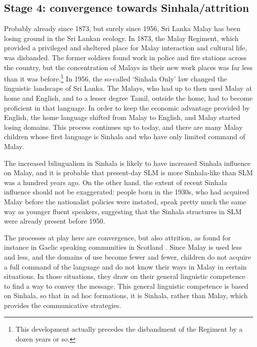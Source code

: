 


\subsection{Stage 4: convergence towards Sinhala/attrition}
Probably already since 1873, but surely since 1956, Sri Lanka Malay has been  losing ground in the Sri Lankan ecology. In 1873, the Malay Regiment, which provided a privileged and sheltered place for Malay interaction and cultural life, was disbanded. The former soldiers found work in police and fire stations across the country, but the concentration of Malays in their new work places was far less than it was before.\footnote{This 
 development actually precedes the disbandment of the Regiment by a dozen years or so.
}
In 1956, the so-called `Sinhala Only' law changed the linguistic landscape of Sri Lanka. The Malays, who had up to then used Malay at home and English, and to a lesser degree Tamil, outside the home, had to become proficient in that language. In order to keep the economic advantage provided by English, the home language shifted from Malay to English, and Malay started losing domains. This process continues up to today, and there are many Malay children whose first language is Sinhala and who have only limited command of Malay.

The increased bilingualism in Sinhala is likely to have increased Sinhala influence on Malay, and it is probable that present-day SLM is more Sinhala-like than SLM was a hundred years ago. On the other hand, the extent of recent Sinhala influence should not be exaggerated: people born in the 1930s, who had acquired Malay before the nationalist policies were instated, speak pretty much the same way as younger fluent speakers, suggesting that the Sinhala structures in SLM were already present before 1950.

The processes at play here are convergence, but also attrition, as found for instance in Gaelic speaking communities in Scotland \citep{Dorian1989}. Since Malay is used less and less, and the domains of use become fewer and fewer, children do not acquire a full command of the language and do not know their ways in Malay in certain situations. In those situations, they draw on their general linguistic competence to find a way to convey the message. This general linguistic competence is based on Sinhala, so that in ad hoc formations, it is Sinhala, rather than Malay, which provides the communicative strategies. 

